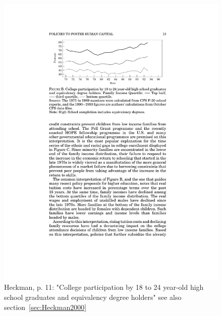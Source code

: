 \documentclass[12pt,a4paper]{article}
\begin{document}
    \begin{figure}[htb]
      \centering
      \includegraphics[width=12cm]{Meeting 10 Policies to foster human capital - Seite 11.pdf}
      \caption{Heckman, p. 11: "College participation by 18 to 24 year-old high school graduates and equivalency degree holders" see also section~\ref{sec:Heckman2000}}
      \label{fig:Heckman collegeparticipation}
    \end{figure}
\end{document}
